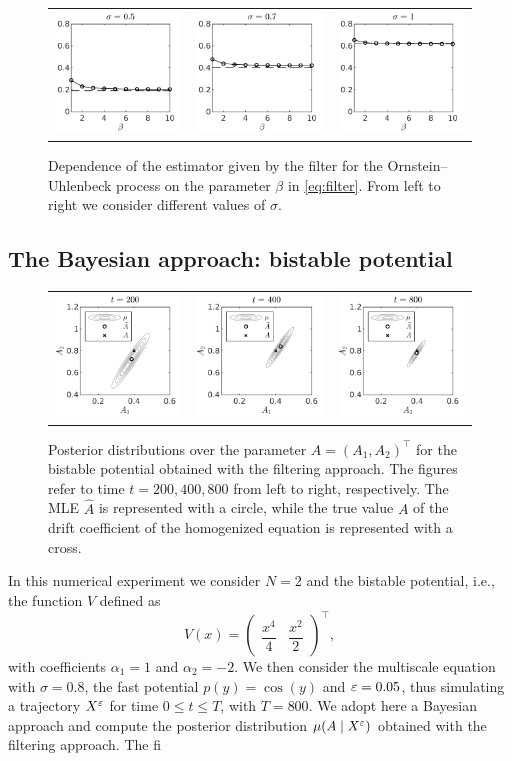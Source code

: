 \documentclass[10pt]{article}
\begin{document}
\begin{figure}[t]
	\centering
	\begin{tabular}{ccc}
		\includegraphics[]{Figures/OUBeta_s5} & \includegraphics[]{Figures/OUBeta_s7}  & \includegraphics[]{Figures/OUBeta_s10} \\
	\end{tabular}
	\caption{Dependence of the estimator given by the filter for the Ornstein--Uhlenbeck process on the parameter $\beta$ in \eqref{eq:filter}. From left to right we consider different values of $\sigma$.}
	\label{fig:OUBeta}
\end{figure}

\subsection{The Bayesian approach: bistable potential}
\begin{figure}[t]
	\centering
	\begin{tabular}{ccc}
		\includegraphics[]{Figures/Bayes_T200} & \includegraphics[]{Figures/Bayes_T400}  & \includegraphics[]{Figures/Bayes_T800} \\
	\end{tabular}
	\caption{Posterior distributions over the parameter $A = (A_1, A_2)^\top$ for the bistable potential obtained with the filtering approach. The figures refer to time $t = 200, 400, 800$ from left to right, respectively. The MLE $\widehat A$ is represented with a circle, while the true value $A$ of the drift coefficient of the homogenized equation is represented with a cross.}
	\label{fig:Bayes}
\end{figure}

In this numerical experiment we consider $N = 2$ and the bistable potential, i.e., the function $V$ defined as
\begin{equation}
	V(x) = \begin{pmatrix} \dfrac{x^4}{4} & \dfrac{x^2}{2} \end{pmatrix}^\top,
\end{equation}
with coefficients $\alpha_1 = 1$ and $\alpha_2 = -2$. We then consider the multiscale equation with $\sigma = 0.8$, the fast potential $p(y) = \cos(y)$ and $\varepsilon = 0.05$, thus simulating a trajectory $X^\varepsilon$ for time $0 \leq t \leq T$, with $T = 800$. We adopt here a Bayesian approach and compute the posterior distribution $\mu(A \mid X^\varepsilon)$ obtained with the filtering approach. The fi
\end{document}
